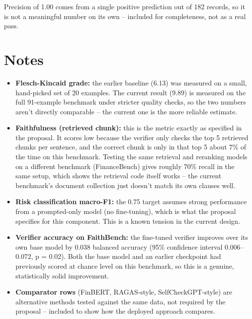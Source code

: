 \documentclass[11pt]{article}
\begin{document}
\vspace{0.3cm}
\noindent *Precision of 1.00 comes from a single positive prediction out of 182 records, so
it is not a meaningful number on its own -- included for completeness, not as a real pass.

\vspace{0.5cm}
\section*{Notes}

\begin{itemize}
\item \textbf{Flesch-Kincaid grade:} the earlier baseline (6.13) was measured on a small,
  hand-picked set of 20 examples. The current result (9.89) is measured on the full
  91-example benchmark under stricter quality checks, so the two numbers aren't directly
  comparable -- the current one is the more reliable estimate.
\item \textbf{Faithfulness (retrieved chunk):} this is the metric exactly as specified in the
  proposal. It scores low because the verifier only checks the top 5 retrieved chunks per
  sentence, and the correct chunk is only in that top 5 about 7\% of the time on this
  benchmark. Testing the same retrieval and reranking models on a different benchmark
  (FinanceBench) gives roughly 70\% recall in the same setup, which shows the retrieval code
  itself works -- the current benchmark's document collection just doesn't match its own
  clauses well.
\item \textbf{Risk classification macro-F1:} the 0.75 target assumes strong performance from a
  prompted-only model (no fine-tuning), which is what the proposal specifies for this
  component. This is a known tension in the current design.
\item \textbf{Verifier accuracy on FaithBench:} the fine-tuned verifier improves over its own
  base model by 0.038 balanced accuracy (95\% confidence interval 0.006--0.072, p = 0.02).
  Both the base model and an earlier checkpoint had previously scored at chance level on this
  benchmark, so this is a genuine, statistically solid improvement.
\item \textbf{Comparator rows} (FinBERT, RAGAS-style, SelfCheckGPT-style) are alternative
  methods tested against the same data, not required by the proposal -- included to show how
  the deployed approach compares.
\end{itemize}
\end{document}
